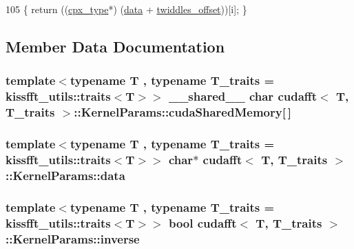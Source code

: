 \begin{DoxyCode}
105 \{ \textcolor{keywordflow}{return} ((\hyperlink{classcudafft_a6b6e4901630f197baf4cf7f165543ece}{cpx\_type}*) (\hyperlink{structcudafft_1_1_kernel_params_ad0cc484b02fe3e05acc1124a9ae38425}{data} + \hyperlink{structcudafft_1_1_kernel_params_a2ee91ebed15013326314b5d803801630}{twiddles\_offset}))[i]; \}
\end{DoxyCode}


\subsection{Member Data Documentation}
\subsubsection[{\texorpdfstring{cuda\+Shared\+Memory}{cudaSharedMemory}}]{\setlength{\rightskip}{0pt plus 5cm}template$<$typename T , typename T\+\_\+traits  = kissfft\+\_\+utils\+::traits$<$\+T$>$$>$ \+\_\+\+\_\+shared\+\_\+\+\_\+ char {\bf cudafft}$<$ T, T\+\_\+traits $>$\+::Kernel\+Params\+::cuda\+Shared\+Memory\mbox{[}$\,$\mbox{]}\hspace{0.3cm}{\ttfamily [static]}}\hypertarget{structcudafft_1_1_kernel_params_af2be5b2ab519a326d5386719ce24226e}{}\label{structcudafft_1_1_kernel_params_af2be5b2ab519a326d5386719ce24226e}
\subsubsection[{\texorpdfstring{data}{data}}]{\setlength{\rightskip}{0pt plus 5cm}template$<$typename T , typename T\+\_\+traits  = kissfft\+\_\+utils\+::traits$<$\+T$>$$>$ char$\ast$ {\bf cudafft}$<$ T, T\+\_\+traits $>$\+::Kernel\+Params\+::data}\hypertarget{structcudafft_1_1_kernel_params_ad0cc484b02fe3e05acc1124a9ae38425}{}\label{structcudafft_1_1_kernel_params_ad0cc484b02fe3e05acc1124a9ae38425}
\subsubsection[{\texorpdfstring{inverse}{inverse}}]{\setlength{\rightskip}{0pt plus 5cm}template$<$typename T , typename T\+\_\+traits  = kissfft\+\_\+utils\+::traits$<$\+T$>$$>$ bool {\bf cudafft}$<$ T, T\+\_\+traits $>$\+::Kernel\+Params\+::inverse}\hypertarget{structcudafft_1_1_kernel_params_a3f28c1de3298efe072243b0ea196b03f}{}\label{structcudafft_1_1_kernel_params_a3f28c1de3298efe072243b0ea196b03f}
